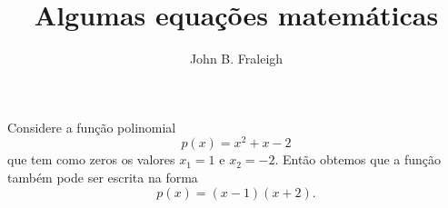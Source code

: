\documentclass[12pt, a4paper]{article}
\title{Algumas equações matemáticas}
\author{John B. Fraleigh}
\date{}
\begin{document}
  \maketitle

  Considere a função polinomial
  \[
    p(x) = x^2 + x - 2
  \]
  que tem como zeros os valores $x_1 = 1$ e $x_2 = -2$. Então obtemos que a função também pode ser escrita na forma
  \begin{equation}
    p(x) = (x-1)(x+2).
  \end{equation}
\end{document}

